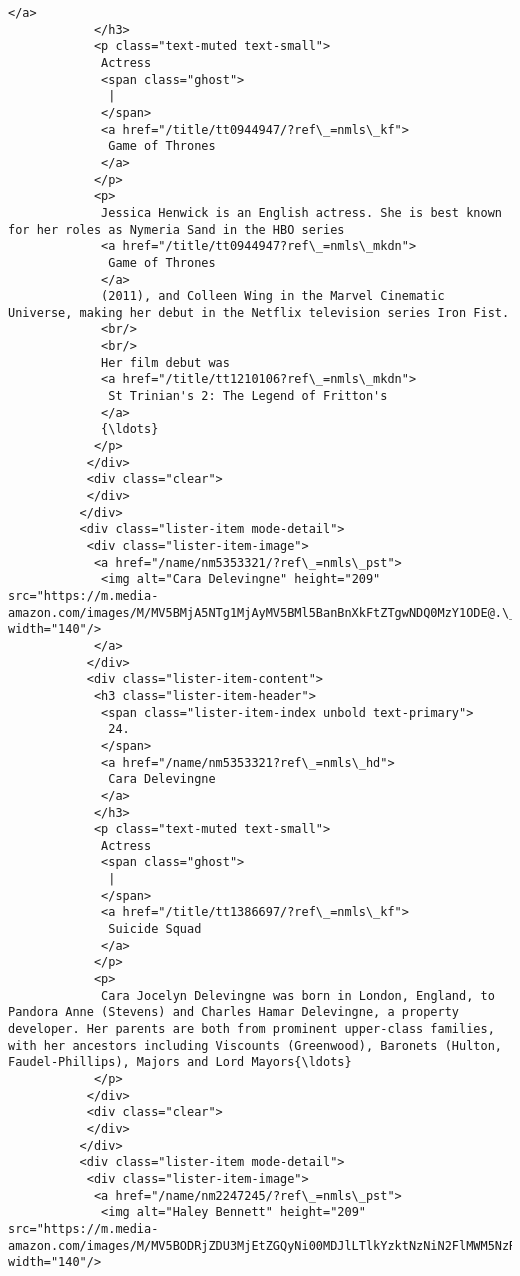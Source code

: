 \documentclass[11pt]{article}
\begin{document}
\begin{Verbatim}[commandchars=\\\{\}]
             </a>
            </h3>
            <p class="text-muted text-small">
             Actress
             <span class="ghost">
              |
             </span>
             <a href="/title/tt0944947/?ref\_=nmls\_kf">
              Game of Thrones
             </a>
            </p>
            <p>
             Jessica Henwick is an English actress. She is best known for her roles as Nymeria Sand in the HBO series
             <a href="/title/tt0944947?ref\_=nmls\_mkdn">
              Game of Thrones
             </a>
             (2011), and Colleen Wing in the Marvel Cinematic Universe, making her debut in the Netflix television series Iron Fist.
             <br/>
             <br/>
             Her film debut was
             <a href="/title/tt1210106?ref\_=nmls\_mkdn">
              St Trinian's 2: The Legend of Fritton's
             </a>
             {\ldots}
            </p>
           </div>
           <div class="clear">
           </div>
          </div>
          <div class="lister-item mode-detail">
           <div class="lister-item-image">
            <a href="/name/nm5353321/?ref\_=nmls\_pst">
             <img alt="Cara Delevingne" height="209" src="https://m.media-amazon.com/images/M/MV5BMjA5NTg1MjAyMV5BMl5BanBnXkFtZTgwNDQ0MzY1ODE@.\_V1\_UY209\_CR19,0,140,209\_AL\_.jpg" width="140"/>
            </a>
           </div>
           <div class="lister-item-content">
            <h3 class="lister-item-header">
             <span class="lister-item-index unbold text-primary">
              24.
             </span>
             <a href="/name/nm5353321?ref\_=nmls\_hd">
              Cara Delevingne
             </a>
            </h3>
            <p class="text-muted text-small">
             Actress
             <span class="ghost">
              |
             </span>
             <a href="/title/tt1386697/?ref\_=nmls\_kf">
              Suicide Squad
             </a>
            </p>
            <p>
             Cara Jocelyn Delevingne was born in London, England, to Pandora Anne (Stevens) and Charles Hamar Delevingne, a property developer. Her parents are both from prominent upper-class families, with her ancestors including Viscounts (Greenwood), Baronets (Hulton, Faudel-Phillips), Majors and Lord Mayors{\ldots}
            </p>
           </div>
           <div class="clear">
           </div>
          </div>
          <div class="lister-item mode-detail">
           <div class="lister-item-image">
            <a href="/name/nm2247245/?ref\_=nmls\_pst">
             <img alt="Haley Bennett" height="209" src="https://m.media-amazon.com/images/M/MV5BODRjZDU3MjEtZGQyNi00MDJlLTlkYzktNzNiN2FlMWM5NzRiXkEyXkFqcGdeQXVyNjA0OTkxNjQ@.\_V1\_UY209\_CR8,0,140,209\_AL\_.jpg" width="140"/>

\end{Verbatim}
\end{document}
